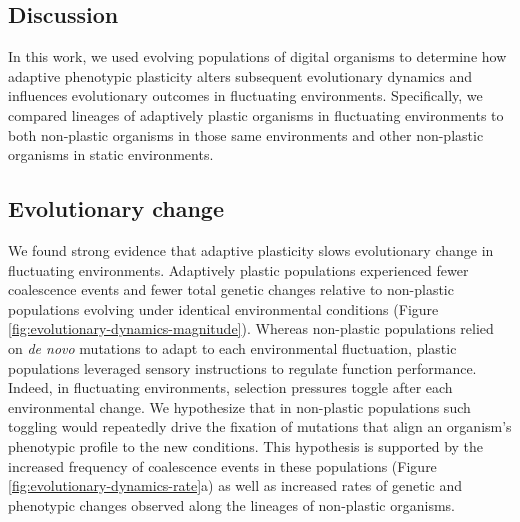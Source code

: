 \begin{raggedbottom}
\section{Discussion}

In this work, we used evolving populations of digital organisms to determine how adaptive phenotypic plasticity alters subsequent evolutionary dynamics and influences evolutionary outcomes in fluctuating environments.
Specifically, we compared lineages of adaptively plastic organisms in fluctuating environments to both non-plastic organisms in those same environments and other non-plastic organisms in static environments.

\subsection{Evolutionary change}

We found strong evidence that adaptive plasticity slows evolutionary change in fluctuating environments.
Adaptively plastic populations experienced fewer coalescence events and fewer total genetic changes relative to non-plastic populations evolving under identical environmental conditions (Figure \ref{fig:evolutionary-dynamics-magnitude}).
Whereas non-plastic populations relied on \textit{de novo} mutations to adapt to each environmental fluctuation, plastic populations leveraged sensory instructions to regulate function performance.
Indeed, in fluctuating environments, selection pressures toggle after each environmental change.
We hypothesize that in non-plastic populations such toggling would repeatedly drive the fixation of mutations that align an organism's phenotypic profile to the new conditions.
This hypothesis is supported by the increased frequency of coalescence events in these populations (Figure \ref{fig:evolutionary-dynamics-rate}a) as well as increased rates of genetic and phenotypic changes observed along the lineages of non-plastic organisms.


\end{raggedbottom}
